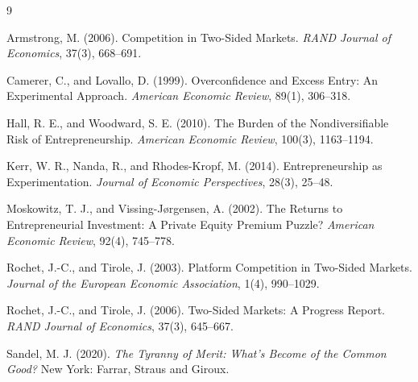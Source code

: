 \documentclass[11pt]{article}
\theoremstyle{remark}
\begin{document}
\clearpage
\begin{thebibliography}{9}

Armstrong, M. (2006). Competition in Two-Sided Markets. \emph{RAND Journal of Economics}, 37(3), 668--691.

Camerer, C., and Lovallo, D. (1999). Overconfidence and Excess Entry: An Experimental Approach. \emph{American Economic Review}, 89(1), 306--318.

Hall, R. E., and Woodward, S. E. (2010). The Burden of the Nondiversifiable Risk of Entrepreneurship. \emph{American Economic Review}, 100(3), 1163--1194.

Kerr, W. R., Nanda, R., and Rhodes-Kropf, M. (2014). Entrepreneurship as Experimentation. \emph{Journal of Economic Perspectives}, 28(3), 25--48.

Moskowitz, T. J., and Vissing-J{\o}rgensen, A. (2002). The Returns to Entrepreneurial Investment: A Private Equity Premium Puzzle? \emph{American Economic Review}, 92(4), 745--778.

Rochet, J.-C., and Tirole, J. (2003). Platform Competition in Two-Sided Markets. \emph{Journal of the European Economic Association}, 1(4), 990--1029.

Rochet, J.-C., and Tirole, J. (2006). Two-Sided Markets: A Progress Report. \emph{RAND Journal of Economics}, 37(3), 645--667.

Sandel, M. J. (2020). \emph{The Tyranny of Merit: What's Become of the Common Good?} New York: Farrar, Straus and Giroux.

\end{thebibliography}
\end{document}
